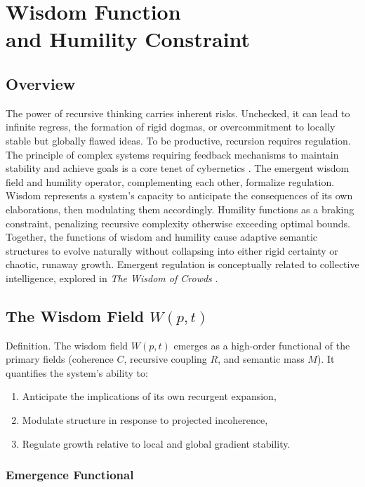 \chapter{Wisdom Function \\ and Humility Constraint}

\section{Overview}

The power of recursive thinking carries inherent risks. Unchecked, it can lead to infinite regress, the formation of rigid dogmas, or overcommitment to locally stable but globally flawed ideas. To be productive, recursion requires regulation. The principle of complex systems requiring feedback mechanisms to maintain stability and achieve goals is a core tenet of cybernetics \autocite{Wiener1948, Ashby1952}. The emergent wisdom field and humility operator, complementing each other, formalize regulation. Wisdom represents a system's capacity to anticipate the consequences of its own elaborations, then modulating them accordingly. Humility functions as a braking constraint, penalizing recursive complexity otherwise exceeding optimal bounds. Together, the functions of wisdom and humility cause adaptive semantic structures to evolve naturally without collapsing into either rigid certainty or chaotic, runaway growth. Emergent regulation is conceptually related to collective intelligence, explored in \textit{The Wisdom of Crowds} \autocite{Surowiecki2004}.

\section{The Wisdom Field \(W(p, t)\)}

Definition.
The wisdom field \(W(p, t)\) emerges as a high-order functional of the primary fields (coherence \(C\), recursive coupling \(R\), and semantic mass \(M\)). It quantifies the system's ability to:

\begin{enumerate}
    \item Anticipate the implications of its own recurgent expansion,
    \item Modulate structure in response to projected incoherence,
    \item Regulate growth relative to local and global gradient stability.
\end{enumerate}

\subsection{Emergence Functional}

